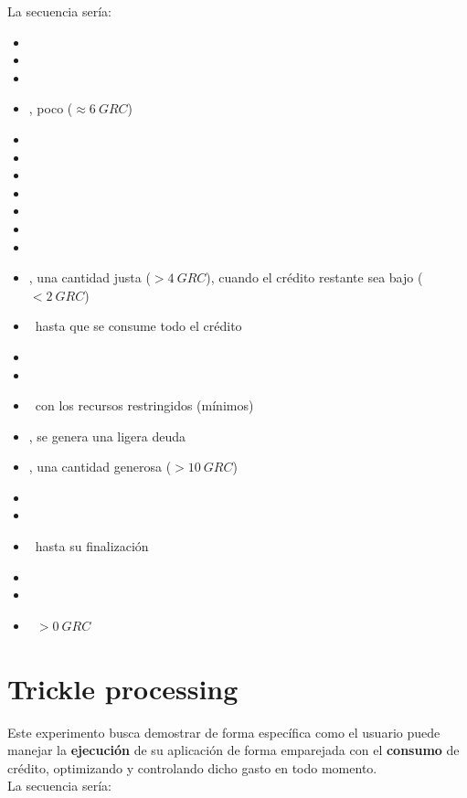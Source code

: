 \documentclass[preprint,3p]{elsarticle}
\begin{document}
\noindent 
La secuencia sería:
\begin{itemize}
	\setlength\itemsep{0em}
	\setlength{\itemindent}{-2mm}
	\item \DataGenerationAll
	\item \ContainerUp
	\item \UserNoCredit
	\item \UserSendsCredit, poco ($\approx 6~GRC$)
	\item \UserAccountingActivated
	\item \ServerlessDown
	\item \AccountingIdle
	\item \AppStart
	\item \ServerlessUp
	\item \AccountingConsumes
	\item \AppRuns
	\item \UserSendsCredit, una cantidad justa ($ > 4~GRC$), cuando el crédito restante sea bajo ($ < 2~GRC$)
	\item \AppRuns~hasta que se consume todo el crédito 
	\item \CreditDepleted
	\item \AccountingRestricts
	\item \AppRuns~con los recursos restringidos (mínimos)
	\item \AccountingConsumes, se genera una ligera deuda
	\item \UserSendsCredit, una cantidad generosa ($ > 10~GRC$)
	\item \AccountingAllows
	\item \ServerlessAdapts
	\item \AppRuns~hasta su finalización
	\item \ServerlessDown
	\item \AccountingIdle
	\item \AccountingCredit~$ > 0~GRC$
\end{itemize}


\newpage
\section{Trickle processing}


\noindent 
Este experimento busca demostrar de forma específica como el usuario puede manejar la \textbf{ejecución} de su aplicación de forma emparejada con el \textbf{consumo} de crédito, optimizando y controlando dicho gasto en todo momento.\\

\noindent 
La secuencia sería:
\end{document}

